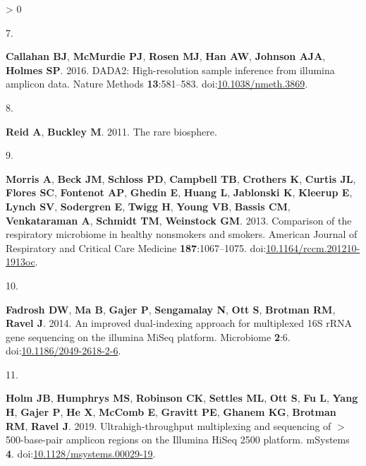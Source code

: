 \documentclass[
]{article}
\newlength{\cslhangindent}
\newlength{\csllabelwidth}
\newenvironment{CSLReferences}[3] %
 {%
  \setlength{\parindent}{0pt}
  \ifodd #1 \everypar{\setlength{\hangindent}{\cslhangindent}}\ignorespaces\fi
  \ifnum #2 > 0
  \setlength{\parskip}{#2\baselineskip}
  \fi
 }%
 {}
\newcommand{\CSLLeftMargin}[1]{\parbox[t]{\csllabelwidth}{#1}}
\newcommand{\CSLRightInline}[1]{\parbox[t]{\linewidth - \csllabelwidth}{#1}}
\begin{document}
\begin{CSLReferences}{0}{0}
\leavevmode\hypertarget{ref-Callahan2016}{}%
\CSLLeftMargin{7. }
\CSLRightInline{\textbf{Callahan BJ}, \textbf{McMurdie PJ},
\textbf{Rosen MJ}, \textbf{Han AW}, \textbf{Johnson AJA}, \textbf{Holmes
SP}. 2016. {DADA}2: High-resolution sample inference from illumina
amplicon data. Nature Methods \textbf{13}:581--583.
doi:\href{https://doi.org/10.1038/nmeth.3869}{10.1038/nmeth.3869}.}

\leavevmode\hypertarget{ref-Reid2011}{}%
\CSLLeftMargin{8. }
\CSLRightInline{\textbf{Reid A}, \textbf{Buckley M}. 2011. The rare
biosphere.}

\leavevmode\hypertarget{ref-Morris2013}{}%
\CSLLeftMargin{9. }
\CSLRightInline{\textbf{Morris A}, \textbf{Beck JM}, \textbf{Schloss
PD}, \textbf{Campbell TB}, \textbf{Crothers K}, \textbf{Curtis JL},
\textbf{Flores SC}, \textbf{Fontenot AP}, \textbf{Ghedin E},
\textbf{Huang L}, \textbf{Jablonski K}, \textbf{Kleerup E},
\textbf{Lynch SV}, \textbf{Sodergren E}, \textbf{Twigg H}, \textbf{Young
VB}, \textbf{Bassis CM}, \textbf{Venkataraman A}, \textbf{Schmidt TM},
\textbf{Weinstock GM}. 2013. Comparison of the respiratory microbiome in
healthy nonsmokers and smokers. American Journal of Respiratory and
Critical Care Medicine \textbf{187}:1067--1075.
doi:\href{https://doi.org/10.1164/rccm.201210-1913oc}{10.1164/rccm.201210-1913oc}.}

\leavevmode\hypertarget{ref-Fadrosh2014}{}%
\CSLLeftMargin{10. }
\CSLRightInline{\textbf{Fadrosh DW}, \textbf{Ma B}, \textbf{Gajer P},
\textbf{Sengamalay N}, \textbf{Ott S}, \textbf{Brotman RM},
\textbf{Ravel J}. 2014. An improved dual-indexing approach for
multiplexed 16S {rRNA} gene sequencing on the illumina {MiSeq} platform.
Microbiome \textbf{2}:6.
doi:\href{https://doi.org/10.1186/2049-2618-2-6}{10.1186/2049-2618-2-6}.}

\leavevmode\hypertarget{ref-Holm2019}{}%
\CSLLeftMargin{11. }
\CSLRightInline{\textbf{Holm JB}, \textbf{Humphrys MS}, \textbf{Robinson
CK}, \textbf{Settles ML}, \textbf{Ott S}, \textbf{Fu L}, \textbf{Yang
H}, \textbf{Gajer P}, \textbf{He X}, \textbf{McComb E}, \textbf{Gravitt
PE}, \textbf{Ghanem KG}, \textbf{Brotman RM}, \textbf{Ravel J}. 2019.
Ultrahigh-throughput multiplexing and sequencing of \(>\)500-base-pair
amplicon regions on the {Illumina} {HiSeq} 2500 platform. {mSystems}
\textbf{4}.
doi:\href{https://doi.org/10.1128/msystems.00029-19}{10.1128/msystems.00029-19}.}


\end{CSLReferences}
\end{document}
